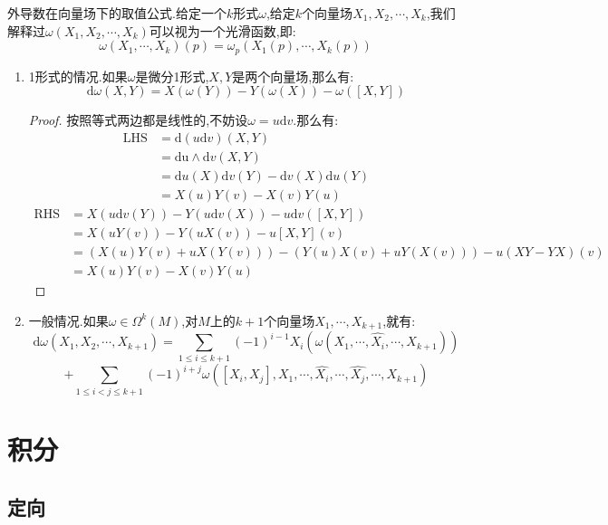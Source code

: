外导数在向量场下的取值公式.给定一个$k$形式$\omega$,给定$k$个向量场$X_1,X_2,\cdots,X_k$,我们解释过$\omega(X_1,X_2,\cdots,X_k)$可以视为一个光滑函数,即:
$$\omega(X_1,\cdots,X_k)(p)=\omega_p(X_1(p),\cdots,X_k(p))$$
\begin{enumerate}
	\item 1形式的情况.如果$\omega$是微分1形式,$X,Y$是两个向量场,那么有:
	$$\mathrm{d}\omega(X,Y)=X(\omega(Y))-Y(\omega(X))-\omega([X,Y])$$
	\begin{proof}
		
		按照等式两边都是线性的,不妨设$\omega=u\mathrm{d}v$.那么有:
		\begin{align*}
		\mathrm{LHS}&=\mathrm{d}(u\mathrm{d}v)(X,Y)\\&=\mathrm{du}\wedge\mathrm{d}v(X,Y)\\&=\mathrm{d}u(X)\mathrm{d}v(Y)-\mathrm{d}v(X)\mathrm{d}u(Y)\\&=X(u)Y(v)-X(v)Y(u)
		\end{align*}
		\begin{align*}
		\mathrm{RHS}&=X(u\mathrm{d}v(Y))-Y(u\mathrm{d}v(X))-u\mathrm{d}v([X,Y])\\&=X(uY(v))-Y(uX(v))-u[X,Y](v)\\&=(X(u)Y(v)+uX(Y(v)))-(Y(u)X(v)+uY(X(v)))-u(XY-YX)(v)\\&=X(u)Y(v)-X(v)Y(u)
		\end{align*}
	\end{proof}
    \item 一般情况.如果$\omega\in\Omega^k(M)$,对$M$上的$k+1$个向量场$X_1,\cdots,X_{k+1}$,就有:
    $$\mathrm{d}\omega(X_1,X_2,\cdots,X_{k+1})=\sum_{1\le i\le k+1}(-1)^{i-1}X_i\left(\omega(X_1,\cdots,\hat{X_i},\cdots,X_{k+1})\right)$$
    $$+\sum_{1\le i<j\le k+1}(-1)^{i+j}\omega\left([X_i,X_j],X_1,\cdots,\hat{X_i},\cdots,\hat{X_j},\cdots,X_{k+1}\right)$$
\end{enumerate}

\newpage
\section{积分}
\subsection{定向}

